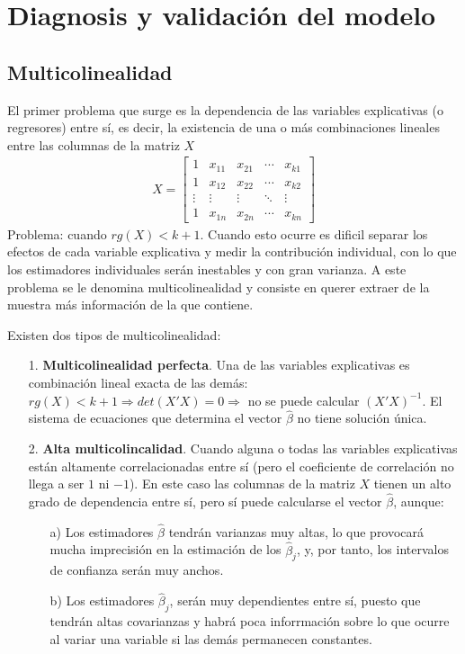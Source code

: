 \section{Diagnosis y validación del modelo}

\subsection{Multicolinealidad}
El primer problema que surge es la dependencia de las variables explicativas (o regresores) entre sí, es decir, la existencia de una o más combinaciones lineales entre las columnas de la matriz $X$
\begin{align*}
    X = \begin{bmatrix}
            1      & x_{11} & x_{21} & \cdots & x_{k1} \\
            1      & x_{12} & x_{22} & \cdots & x_{k2} \\
            \vdots & \vdots & \vdots & \ddots & \vdots \\
            1      & x_{1n} & x_{2n} & \cdots & x_{kn}
        \end{bmatrix}
\end{align*}
Problema: cuando $rg(X) < k +1$. Cuando esto ocurre es dificil separar los efectos de cada variable explicativa y medir la contribución individual, con lo que los estimadores individuales serán inestables y con gran varianza. A este problema se le denomina multicolinealidad y consiste en querer extraer de la muestra más información de la que contiene.

Existen dos tipos de multicolinealidad:
\begin{enumerate}
    \item[1.] \textbf{Multicolinealidad perfecta}. Una de las variables explicativas es combinación lineal exacta de las demás: $rg(X) < k+1 \Longrightarrow det(X'X) = 0 \Longrightarrow$ no se puede calcular $(X'X)^{-1}$. El sistema de ecuaciones que determina el vector $\widehat{\beta}$ no tiene solución única.
    \item[2.]\textbf{Alta multicolincalidad}. Cuando alguna o todas las variables explicativas están altamente correlacionadas entre sí (pero el coeficiente de correlación no llega a ser $1$ ni $-1$). En este caso las columnas de la matriz $X$ tienen un alto grado de dependencia entre sí, pero sí puede calcularse el vector $\widehat{\beta}$, aunque:
          \begin{enumerate}
              \item[a)] Los estimadores $\widehat{\beta}$ tendrán varianzas muy altas, lo que provocará mucha imprecisión en la estimación de los $\widehat{\beta}_j$, y, por tanto, los intervalos de confianza serán muy anchos.
              \item[b)] Los estimadores $\widehat{\beta}_j$, serán muy dependientes entre sí, puesto que tendrán altas covarianzas y habrá poca inforrmación sobre lo que ocurre al variar una variable si las demás permanecen constantes.
          \end{enumerate}
\end{enumerate}

